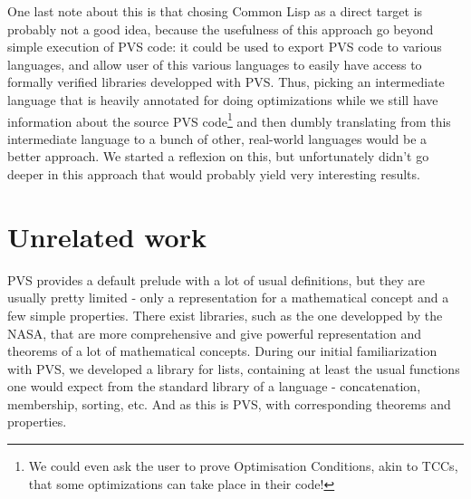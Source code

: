 \documentclass[utf8,a4paper]{article}
\begin{document}
One last note about this is that chosing Common Lisp as a direct
target is probably not a good idea, because the usefulness of this
approach go beyond simple execution of PVS code: it could be used to
export PVS code to various languages, and allow user of this various
languages to easily have access to formally verified libraries
developped with PVS. Thus, picking an intermediate language that is
heavily annotated for doing optimizations while we still have
information about the source PVS code\footnote{We could even ask the
  user to prove Optimisation Conditions, akin to TCCs, that some
  optimizations can take place in their code!} and then dumbly
translating from this intermediate language to a bunch of other,
real-world languages would be a better approach. We started a
reflexion on this, but unfortunately didn't go deeper in this approach
that would probably yield very interesting results.

\section{Unrelated work}
\label{sec:lists}

PVS provides a default prelude with a lot of usual definitions, but
they are usually pretty limited - only a representation for a
mathematical concept and a few simple properties. There exist
libraries, such as the one developped by the NASA, that are more
comprehensive and give powerful representation and theorems of a lot
of mathematical concepts. During our initial familiarization with PVS,
we developed a library for lists, containing at least the usual
functions one would expect from the standard library of a language -
concatenation, membership, sorting, etc. And as this is PVS, with
corresponding theorems and properties.
\end{document}
